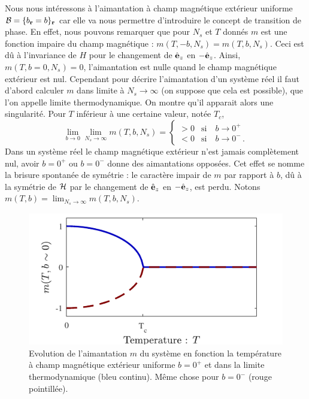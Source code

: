 \documentclass[10.5pt]{article}
\begin{document}
\begin{multicols*}{2}
Nous nous intéressons à l'aimantation à champ magnétique extérieur uniforme $\mathcal{B} = \{b_{\bf r} = b\}_{\bf r}$ car elle va nous permettre d'introduire le concept de transition de phase. En effet, nous pouvons remarquer que pour $N_s$ et $T$ donnés $m$ est une fonction impaire du champ magnétique : $m(T, -b, N_s) = m(T, b, N_s)$. Ceci est dû à l'invariance de $H$ pour le changement de $\hat{\mathbf{e}}_z$ en $-\hat{\mathbf{e}}_z$. Ainsi, $m(T, b=0, N_s) = 0$, l'aimantation est nulle quand le champ magnétique extérieur est nul. Cependant pour décrire l'aimantation d'un système réel il faut d'abord calculer $m$ dans limite à $N_s \to \infty$ (on suppose que cela est possible), que l'on appelle limite thermodynamique. On montre qu'il apparait alors une singularité. Pour $T$ inférieur à une certaine valeur, notée $T_c$, 
\begin{equation}
	\lim_{b\to 0} \lim_{N_s\to \infty} m(T,b,N_s) =
	\begin{cases}
			> 0 & \text{si} \quad b \to 0^+ \\
			< 0 & \text{si} \quad b  \to 0^- \, .
	\end{cases}
\end{equation}
Dans un système réel le champ magnétique extérieur n'est jamais complètement nul, avoir $b = 0^+$ ou $b=0^-$ donne des aimantations opposées. Cet effet se nomme la brisure spontanée de symétrie : le caractère impair de $m$ par rapport à $b$, dû à la symétrie de $\mathcal{H}$ par le changement de $\hat{\mathbf{e}}_z$ en $-\hat{\mathbf{e}}_z$, est perdu. Notons $m(T, b)= \lim_{N_s \to \infty} m(T,b,N_s)$.
\begin{figure}[H]
\begin{center}
\includegraphics[width=0.95\columnwidth]{aimantation.pdf}
\caption{Evolution de l'aimantation $m$ du système en fonction la température à champ magnétique extérieur uniforme $b = 0^+$ et dans la limite thermodynamique (bleu continu). Même chose pour $b = 0^-$ (rouge pointillée).}
\label{fig:aimantation}

\end{center}
\end{figure}
\end{multicols*}
\end{document}
